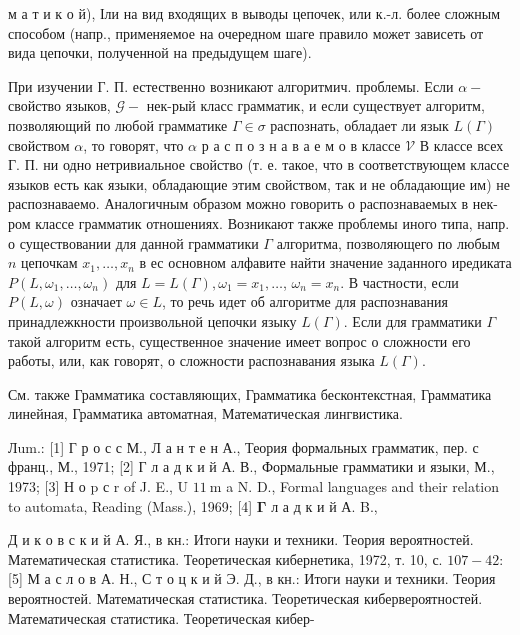 \documentclass[10pt]{article}
\begin{document}
м а т и к о й), Іли на вид входящих в выводы цепочек, или к.-л. более сложным способом (напр., применяемое на очередном шаге правило может зависеть от вида цепочки, полученной на предыдущем шаге).



При изучении Г. П. естественно возникают алгоритмич. проблемы. Если $\alpha-$ свойство языков, $\mathscr{G}-$ нек-рый класс грамматик, и если существует алгоритм, позволяющий по любой грамматике $\Gamma \in \mathscr{\sigma}$ распознать, обладает ли язык $L(\Gamma)$ свойством $\alpha$, то говорят, что $\alpha$ р а с п о з н а в а е м о в классе $\mathscr{V}$ В классе всех Г. П. ни одно нетривиальное свойство (т. е. такое, что в соответствующем классе языков есть как языки, обладающие этим свойством, так и не обладающие им) не распознаваемо. Аналогичным образом можно говорить о распознаваемых в нек-ром классе грамматик отношениях. Возникают также проблемы иного типа, напр. о существовании для данной грамматики $\Gamma$ алгоритма, позволяющего по любым $n$ цепочкам $x_{1}, \ldots, x_{n}$ в ес основном алфавите найти значение заданного иредиката $P\left(L, \omega_{1}, \ldots, \omega_{n}\right)$ для $L=L(\Gamma), \omega_{1}=x_{1}, \ldots$, $\omega_{n}=x_{n}$. В частности, если $P(L, \omega)$ означает $\omega \in L$, то речь идет об алгоритме для распознавания принадлежкности произвольной цепочки языку $L(\Gamma)$. Если для грамматики $\Gamma$ такой алгоритм есть, существенное значение имеет вопрос о сложности его работы, или, как говорят, о сложности распознавания языка $L(\Gamma)$.



См. также Грамматика составляющих, Грамматика бесконтекстная, Грамматика линейная, Грамматика автоматная, Математическая лингвистика.



Лum.: [1] Г р о с с М., Л а н т е н А., Теория формальных грамматик, пер. с франц., М., 1971; [2] Г л а д к и й А. В., Формальные грамматики и языки, М., 1973; [3] Н о p с r of J. E., U $11 \mathrm{~m}$ a $\mathrm{N}$. D., Formal languages and their relation to automata, Reading (Mass.), 1969; [4] $\boldsymbol{\Gamma}$ л а д к и й А. B.,

Д и к о в с к и й А. Я., в кн.: Итоги науки и техники. Теория вероятностей. Математическая статистика. Теоретическая кибернетика, 1972, т. 10, с. $107-42:$ [5] М а с л о в А. Н., С т о ц к и й Э. Д., в кн.: Итоги науки и техники. Теория вероятностей. Математическая статистика. Теоретическая кибервероятностей. Математическая статистика. Теоретическая кибер-
\end{document}
